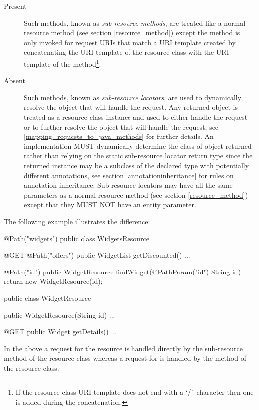 \begin{description}
\item[Present] Such methods, known as {\em sub-resource methods}, are treated like a normal resource method (see section \ref{resource_method}) except the method is only invoked for request URIs that match a URI template created by concatenating the URI template of the resource class with the URI template of the method\footnote{If the resource class URI template does not end with a \lq/\rq\ character then one is added during the concatenation.}.
\item[Absent] Such methods, known as {\em sub-resource locators}, are used to dynamically resolve the object that will handle the request. Any returned object is treated as a resource class instance and used to either handle the request or to further resolve the object that will handle the request, see \ref{mapping_requests_to_java_methods} for further details. An implementation MUST dynamically determine the class of object returned rather than relying on the static sub-resource locator return type since the returned instance may be a subclass of the declared type with potentially different annotations, see section \ref{annotationinheritance} for rules on annotation inheritance. Sub-resource locators may have all the same parameters as a normal resource method (see section \ref{resource_method}) except that they MUST NOT have an entity parameter. 
\end{description}

The following example illustrates the difference:

\begin{listing}{1}
@Path("widgets")
public class WidgetsResource {
  @GET
  @Path("offers")
  public WidgetList getDiscounted() {...}
  
  @Path("{id}")
  public WidgetResource findWidget(@PathParam("id") String id) {
    return new WidgetResource(id);
  }
}

public class WidgetResource {
  public WidgetResource(String id) {...}

  @GET
  public Widget getDetails() {...}
}\end{listing}

In the above a  request for the  resource is handled directly by the  sub-resource method of the resource class  whereas a  request for  is handled by the  method of the  resource class.

